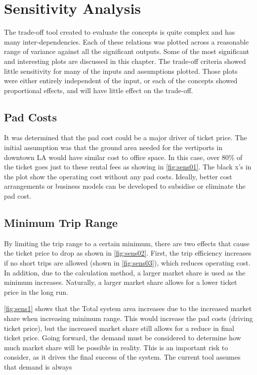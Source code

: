 \newpage
\chapter{Sensitivity Analysis} \label{ch:sensitivity}

The trade-off tool created to evaluate the concepts is quite complex and has many inter-dependencies. Each of these relations was plotted across a reasonable range of variance against all the significant outputs. Some of the most significant and interesting plots are discussed in this chapter. The trade-off criteria showed little sensitivity for many of the inputs and assumptions plotted. Those plots were either entirely independent of the input, or each of the concepts showed proportional effects, and will have little effect on the trade-off.

\section{Pad Costs}
It was determined that the pad cost could be a major driver of ticket price. The initial assumption was that the ground area needed for the vertiports in downtown LA would have similar cost to office space. In this case, over 80\% of the ticket goes just to these rental fees as showing in \autoref{fig:sens01}. The black x's in the plot show the operating cost without any pad costs. Ideally, better cost arrangements or business models can be developed to subsidise or eliminate the pad cost.

\section{Minimum Trip Range}
By limiting the trip range to a certain minimum, there are two effects that cause the ticket price to drop as shown in \autoref{fig:sens02}. First, the trip efficiency increases if no short trips are allowed (shown in \autoref{fig:sens03}), which reduces operating cost. In addition, due to the calculation method, a larger market share is used as the minimum increases. Naturally, a larger market share allows for a lower ticket price in the long run. 

\autoref{fig:sens1} shows that the Total system area increases due to the increased market share when increasing minimum range. This would increase the pad costs (driving ticket price), but the increased market share still allows for a reduce in final ticket price. Going forward, the demand must be considered to determine how much market share will be possible in reality. This is an important risk to consider, as it drives the final success of the system. The current tool assumes that demand is always 




